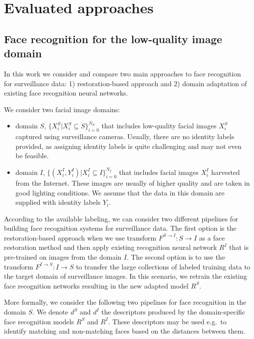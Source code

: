 \section{Evaluated approaches}
\label{sect:method}


\subsection{Face recognition for the low-quality image domain}
\label{sect:strategies}
In this work we consider and compare two main approaches to face recognition for surveillance data: 1) restoration-based approach and 2) domain adaptation of existing face recognition neural networks. 

We consider two facial image domains: \begin{itemize}
\item domain $S$, $\{X^{S}_{i}| X^{S}_{i} \subseteq S \}_{i=0}^{N_S}$ that includes low-quality facial images $X^{S}_{i}$ captured using surveillance cameras. Usually, there are no identity labels provided, as assigning identity labels is quite challenging and may not even be feasible.
\item domain $I$, $\{(X^{I}_{i}, Y^{I}_{i}) | X^{I}_{i} \subseteq I \}_{i=0}^{N_I}$ that includes facial images $X^{I}_{i}$ harvested from the Internet. These images are usually of higher quality and are taken in good lighting conditions. We assume that the data in this domain are supplied with identity labels $Y_i$.
\end{itemize}  

According to the available labeling, we can consider two different pipelines for building face recognition systems for surveillance data. The first option is the restoration-based approach when we use transform $F^{S \rightarrow I}: S \longrightarrow I$ as a face restoration method and then apply existing recognition neural network $R^{I}$ that is pre-trained on images from the domain $I$. The second option is to use the transform $F^{I \rightarrow S}: I \longrightarrow S$ to transfer the large collections of labeled training data to the target domain of surveillance images. In this scenario, we retrain the existing face recognition networks resulting in the new adapted model $R^{S}$.

More formally, we consider the following two pipelines for face recognition in the domain $S$.  We denote $d^{S}$ and $d^{I}$ the descriptors produced by the domain-specific face recognition models $R^{S}$ and $R^{I}$. These descriptors may be used e.g.\ to identify matching and non-matching faces based on the distances between them. 
 
